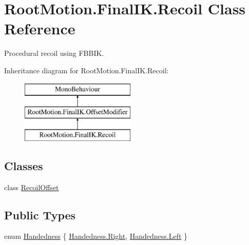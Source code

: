 \hypertarget{class_root_motion_1_1_final_i_k_1_1_recoil}{}\section{Root\+Motion.\+Final\+I\+K.\+Recoil Class Reference}
\label{class_root_motion_1_1_final_i_k_1_1_recoil}


Procedural recoil using F\+B\+B\+IK.  


Inheritance diagram for Root\+Motion.\+Final\+I\+K.\+Recoil\+:\begin{figure}[H]
\begin{center}
\leavevmode
\includegraphics[height=3.000000cm]{class_root_motion_1_1_final_i_k_1_1_recoil}
\end{center}
\end{figure}
\subsection*{Classes}
\begin{DoxyCompactItemize}
\item 
class \mbox{\hyperlink{class_root_motion_1_1_final_i_k_1_1_recoil_1_1_recoil_offset}{Recoil\+Offset}}
\end{DoxyCompactItemize}
\subsection*{Public Types}
\begin{DoxyCompactItemize}
\item 
enum \mbox{\hyperlink{class_root_motion_1_1_final_i_k_1_1_recoil_ad513149868a013010de6e3242480f804}{Handedness}} \{ \mbox{\hyperlink{class_root_motion_1_1_final_i_k_1_1_recoil_ad513149868a013010de6e3242480f804a92b09c7c48c520c3c55e497875da437c}{Handedness.\+Right}}, 
\mbox{\hyperlink{class_root_motion_1_1_final_i_k_1_1_recoil_ad513149868a013010de6e3242480f804a945d5e233cf7d6240f6b783b36a374ff}{Handedness.\+Left}}
 \}
\end{DoxyCompactItemize}
